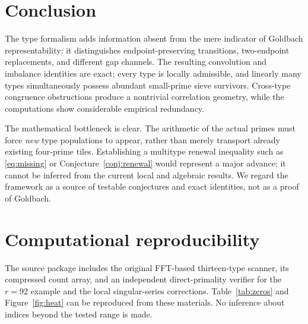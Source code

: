 \documentclass[11pt,a4paper]{article}
\theoremstyle{definition}
\theoremstyle{remark}
\begin{document}
\section{Conclusion}
The type formalism adds information absent from the mere indicator of Goldbach representability: it distinguishes endpoint-preserving transitions, two-endpoint replacements, and different gap channels. The resulting convolution and imbalance identities are exact; every type is locally admissible, and linearly many types simultaneously possess abundant small-prime sieve survivors.  Cross-type congruence obstructions produce a nontrivial correlation geometry, while the computations show considerable empirical redundancy.

The mathematical bottleneck is clear.  The arithmetic of the actual primes must force \emph{new} type populations to appear, rather than merely transport already existing four-prime tiles.  Establishing a multitype renewal inequality such as \eqref{eq:missing} or Conjecture~\ref{conj:renewal} would represent a major advance; it cannot be inferred from the current local and algebraic results.  We regard the framework as a source of testable conjectures and exact identities, not as a proof of Goldbach.

\section*{Computational reproducibility}
The source package includes the original FFT-based thirteen-type scanner, its compressed count array, and an independent direct-primality verifier for the $r=92$ example and the local singular-series corrections.  Table~\ref{tab:zeros} and Figure~\ref{fig:heat} can be reproduced from these materials.  No inference about indices beyond the tested range is made.



\end{document}
